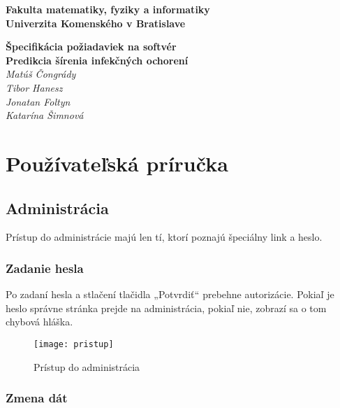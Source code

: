 \documentclass[12pt,a4paper]{report}
\begin{document}
\begin{titlepage}
\centering\bfseries
		Fakulta matematiky, fyziky a informatiky\\Univerzita Komenského v Bratislave	

	\fontsize{23}{28}\textbf{Špecifikácia požiadaviek na softvér}\\
	\fontsize{16}{22}\textbf{Predikcia šírenia infekčných ochorení}\\
	\large\textit{Matúš Čongrády\\Tibor Hanesz\\Jonatan Foltyn\\Katarína Šimnová}

\end{titlepage}\bigskip
	\setcounter{tocdepth}{9}
	\tableofcontents
	
\renewcommand{\chaptername}{}	
	\chapter[Používateľská príručka]{\rmfamily\bfseries
Používateľská príručka}


\section[Administrácia]{\rmfamily\bfseries
	Administrácia}
Prístup do administrácie majú len tí, ktorí poznajú špeciálny link a heslo.

\subsection[Zadanie hesla]{\rmfamily\bfseries
	Zadanie hesla}

Po zadaní hesla a stlačení tlačidla „Potvrdiť“ prebehne autorizácie. Pokiaľ je heslo správne stránka prejde na administrácia, pokiaľ nie, zobrazí sa o tom chybová hláška.

\begin{figure}[htb]
	\centering
	\texttt{[image: pristup]}
	\caption{Prístup do administrácia}
	\label{fig:Prístup do administrácia}
\end{figure}
\pagebreak
\subsection[Zmena dát]{\rmfamily\bfseries
	Zmena dát}
\end{document}
